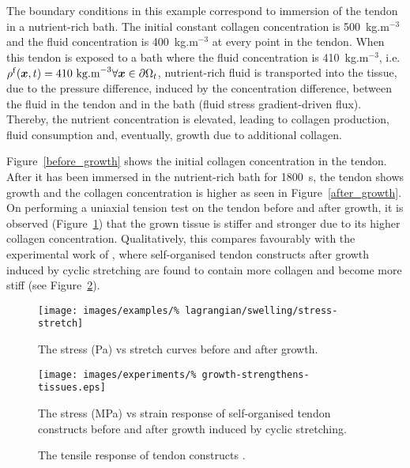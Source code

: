 The boundary conditions in this example correspond to immersion of the
tendon in a nutrient-rich bath. The initial constant collagen
concentration is 500~kg.m$^{-3}$ and the fluid concentration is
400~kg.m$^{-3}$ at every point in the tendon. When this tendon is
exposed to a bath where the fluid concentration is 410~kg.m$^{-3}$,
i.e. $\rho^\mathrm{f}(\mbox{\boldmath$ x$},t)=410~\mathrm{kg.m}^{-3} \forall \mbox{\boldmath$ x$} \in
\partial\Omega_t$, nutrient-rich fluid is transported into the tissue,
due to the pressure difference, induced by the concentration
difference, between the fluid in the tendon and in the bath (fluid
stress gradient-driven flux). Thereby, the nutrient concentration is
elevated, leading to collagen production, fluid consumption and,
eventually, growth due to additional collagen.

Figure~\ref{before_growth} shows the initial collagen concentration in
the tendon. After it has been immersed in the nutrient-rich bath for
1800~s, the tendon shows growth and the collagen concentration is
higher as seen in Figure~\ref{after_growth}. On performing a uniaxial
tension test on the tendon before and after growth, it is observed
(Figure~\ref{stress_strain}) that the grown tissue is stiffer and
stronger due to its higher collagen concentration. Qualitatively, this
compares favourably with the experimental work of
\citet{arrudaetal05}, where self-organised tendon constructs after
growth induced by cyclic stretching are found to contain more collagen
and become more stiff (see
Figure~\ref{experiment-before-after-growth}).

\begin{figure}[!hpt]
  \centering
  \texttt{[image: images/examples/\%
    lagrangian/swelling/stress-stretch]}
  \caption{The stress (Pa) vs stretch curves before and after growth.}
  \label{stress_strain}
\end{figure}

\begin{figure}[!hpt]
  \begin{center}
    \texttt{[image: images/experiments/\%
      growth-strengthens-tissues.eps]}    
    \caption{The tensile response of tendon constructs
      \citep{arrudaetal05}.}
    \label{experiment-before-after-growth}
  \end{center}
  {The stress (MPa) vs strain response of self-organised tendon
    constructs before and after growth induced by cyclic stretching.}
\end{figure}

